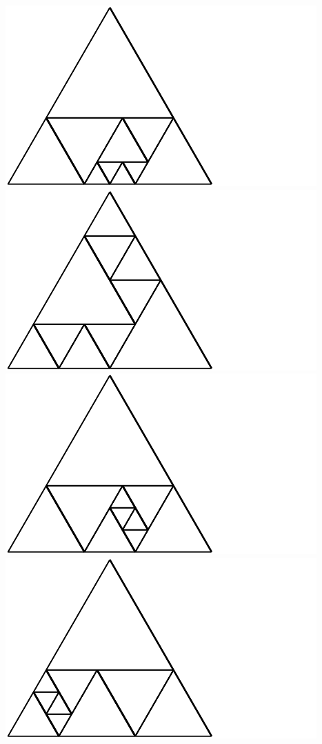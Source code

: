 \documentclass[12pt,amstags,fleqn]{article}
\theoremstyle{plain}
\theoremstyle{definition}
\begin{document}
\includegraphics{output-dissections-dissection10_i21_r2_c3.pdf}
\includegraphics{output-dissections-dissection10_i23_r3_c0.pdf}
\includegraphics{output-dissections-dissection10_i23_r3_c1.pdf}
\includegraphics{output-dissections-dissection10_i23_r3_c2.pdf}
\end{document}
